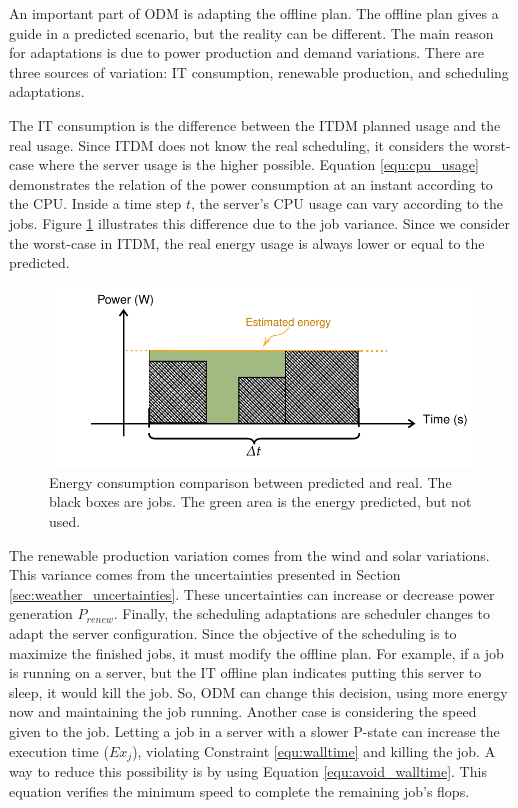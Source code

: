 An important part of ODM is adapting the offline plan. The offline plan gives a guide in a predicted scenario, but the reality can be different. The main reason for adaptations is due to power production and demand variations. There are three sources of variation: IT consumption, renewable production, and scheduling adaptations. 

The IT consumption is the difference between the ITDM planned usage and the real usage. Since ITDM does not know the real scheduling, it considers the worst-case where the server usage is the higher possible. Equation \ref{equ:cpu_usage} demonstrates the relation of the power consumption at an instant according to the CPU. Inside a time step $t$, the server's CPU usage can vary according to the jobs. Figure \ref{fig:energy_consumption} illustrates this difference due to the job variance. Since we consider the worst-case in ITDM, the real energy usage is always lower or equal to the predicted.

\begin{figure}[!htb]
    \centering
    \includegraphics[scale=0.8]{Images/Model/energy_consumption.pdf}
    \caption{Energy consumption comparison between predicted and real. The black boxes are jobs. The green area is the energy predicted, but not used.}
    \label{fig:energy_consumption}
\end{figure}

The renewable production variation comes from the wind and solar variations. This variance comes from the uncertainties presented in Section \ref{sec:weather_uncertainties}. These uncertainties can increase or decrease power generation $P_{renew}$. Finally, the scheduling adaptations are scheduler changes to adapt the server configuration. Since the objective of the scheduling is to maximize the finished jobs, it must modify the offline plan. For example, if a job is running on a server, but the IT offline plan indicates putting this server to sleep, it would kill the job. So, ODM can change this decision, using more energy now and maintaining the job running. Another case is considering the speed given to the job. Letting a job in a server with a slower P-state can increase the execution time ($Ex_j$), violating Constraint \ref{equ:walltime} and killing the job. A way to reduce this possibility is by using Equation \ref{equ:avoid_walltime}. This equation verifies the minimum speed to complete the remaining job's flops. 

